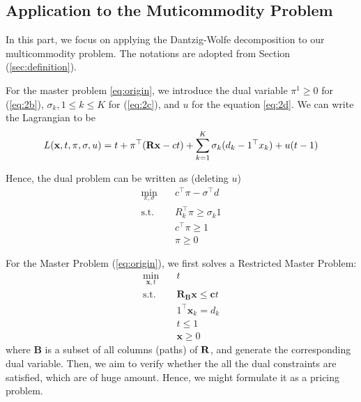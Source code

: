 \subsection{Application to the Muticommodity Problem}
In this part, we focus on applying the Dantzig-Wolfe decomposition to our multicommodity problem. The notations are adopted from Section (\ref{sec:definition}).

For the master problem \ref{eq:origin}, we introduce the dual variable $\pi^1\geq 0$ for (\ref{eq:2b}), $\sigma_k, 1\leq k \leq K$ for (\ref{eq:2c}), and $u$ for the equation \ref{eq:2d}. We can write the Lagrangian to be
\begin{equation}
L(\mathbf{x},t,\pi,\sigma,u)=t+\pi^\top (\mathbf{R} \mathbf{x}-ct) + \sum_{k=1}^K \sigma_k(d_k-1^\top x_k)+u(t-1)
\end{equation}

Hence, the dual problem can be written as (deleting $u$)
\begin{equation}
\begin{split}
        \min_{\pi,\sigma}&\quad c^\top \pi-\sigma^\top d\\
        \text{s.t.}&\quad R_k^\top \pi \geq \sigma_k1\\
        &\quad c^\top \pi \geq 1\\
        &\quad \pi \geq 0 
\end{split}
\end{equation}


For the Master Problem (\ref{eq:origin}), we first solves a Restricted Master Problem: 
\begin{subequations}
\begin{align}
\min _{\mathbf{x},t} \quad & t \\
\text {s.t.} \quad& \mathbf{R_B x} \leq \mathbf{c}t\label{eq:RMPb} \\
& 1^\top \mathbf{x}_{k}=d_{k} \label{eq:RMPc} \\
& t\leq 1 \label{eq:RMPd}\\
& \mathbf{x} \geq 0
\end{align}
\end{subequations}
where $\mathbf{B}$ is a subset of all columns (paths) of $\mathbf{R}$, and generate the corresponding dual variable. Then, we aim to verify whether the all the dual  constraints are satisfied, which are of huge amount. Hence, we might formulate it as a pricing problem. 

